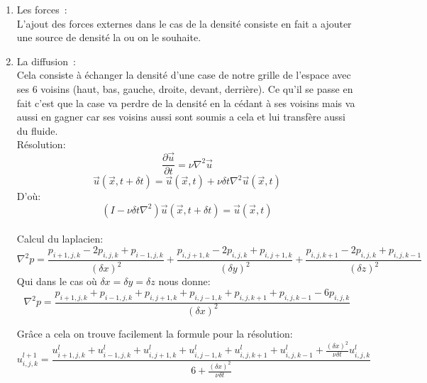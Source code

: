 \documentclass[a4paper,10pt]{article}
\begin{document}
\begin{enumerate}
\item{Les forces~:}\\ L'ajout des forces externes dans le cas de la
  densité consiste en fait a ajouter une source de densité la ou on le
  souhaite.\\
\item{La diffusion~:}\\ Cela consiste à échanger la densité d'une case
  de notre grille de l'espace avec ses 6 voisins (haut, bas, gauche,
  droite, devant, derrière). Ce qu'il se passe en fait c'est que la
  case va perdre de la densité en la cédant à ses voisins mais va
  aussi en gagner car ses voisins aussi sont soumis a cela et lui
  transfère aussi du fluide.\\ 
  
  
  Résolution:
  \begin{equation}
    \frac{\partial \vec{u}}{\partial t} =  \nu{\nabla^2}\vec{u} 
  \end{equation}
  \begin{equation}
    \vec{u}(\vec{x},t+\delta t) = \vec{u}(\vec{x},t) +\nu \delta t {\nabla^2} \vec{u}(\vec{x},t) 
  \end{equation}
  D'où:
  \begin{equation}
    (I - \nu \delta t {\nabla^2})\vec{u}(\vec{x},t+\delta t) = \vec{u}(\vec{x},t) 
  \end{equation}
  \\
  
  Calcul du laplacien:
  \begin{equation}
    {\nabla^2}p = \frac{p_{i+1,j,k} - 2p_{i,j,k} + p_{i-1,j,k} }{({\delta x})^2} + \frac{p_{i,j+1,k} - 2p_{i,j,k} + p_{i,j+1,k}}{({\delta y})^2} + \frac{p_{i,j,k+1} - 2p_{i,j,k} + p_{i,j,k-1}}{({\delta z})^2} 
  \end{equation}
  Qui dans le cas où $\delta x = \delta y =\delta z$ nous donne:
  \begin{equation}
    {\nabla^2}p = \frac{p_{i+1,j,k} + p_{i-1,j,k} + p_{i,j+1,k} + p_{i,j-1,k} + p_{i,j,k+1} + p_{i,j,k-1} - 6p_{i,j,k} }{({\delta x})^2} 
  \end{equation}
  
  Grâce a cela on trouve facilement la formule pour la résolution:
  \begin{equation}
    u_{i,j,k}^{l+1} = \frac{u_{i+1,j,k}^{l} + 
      u_{i-1,j,k}^{l} + 
      u_{i,j+1,k}^{l} +
      u_{i,j-1,k}^{l} + 
      u_{i,j,k+1}^{l} + 
      u_{i,j,k-1}^{l} + 
      \frac{({\delta x})^2}{\nu \delta t} u_{i,j,k}^{l}}{ 6 + \frac{({\delta x})^2}{\nu \delta t}} 
  \end{equation}
  

\end{enumerate}
\end{document}
